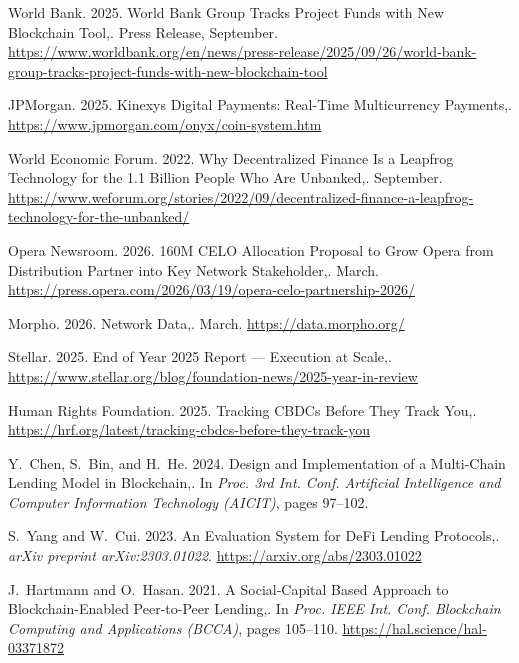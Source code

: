 {\begin{enumerate}[label={[\arabic*]}]
\item World Bank. 2025. World Bank Group Tracks Project Funds with New Blockchain Tool,. Press Release, September. \url{https://www.worldbank.org/en/news/press-release/2025/09/26/world-bank-group-tracks-project-funds-with-new-blockchain-tool}

\item JPMorgan. 2025. Kinexys Digital Payments: Real-Time Multicurrency Payments,. \url{https://www.jpmorgan.com/onyx/coin-system.htm}

\item World Economic Forum. 2022. Why Decentralized Finance Is a Leapfrog Technology for the 1.1 Billion People Who Are Unbanked,. September. \url{https://www.weforum.org/stories/2022/09/decentralized-finance-a-leapfrog-technology-for-the-unbanked/}

\item Opera Newsroom. 2026. 160M CELO Allocation Proposal to Grow Opera from Distribution Partner into Key Network Stakeholder,. March. \url{https://press.opera.com/2026/03/19/opera-celo-partnership-2026/}

\item Morpho. 2026. Network Data,. March. \url{https://data.morpho.org/}

\item Stellar. 2025. End of Year 2025 Report --- Execution at Scale,. \url{https://www.stellar.org/blog/foundation-news/2025-year-in-review}

\item Human Rights Foundation. 2025. Tracking CBDCs Before They Track You,. \url{https://hrf.org/latest/tracking-cbdcs-before-they-track-you}

\item Y.~Chen, S.~Bin, and H.~He. 2024. Design and Implementation of a Multi-Chain Lending Model in Blockchain,. In \emph{Proc. 3rd Int. Conf. Artificial Intelligence and Computer Information Technology (AICIT)}, pages 97--102.

\item S.~Yang and W.~Cui. 2023. An Evaluation System for DeFi Lending Protocols,. \emph{arXiv preprint arXiv:2303.01022}. \url{https://arxiv.org/abs/2303.01022}

\item J.~Hartmann and O.~Hasan. 2021. A Social-Capital Based Approach to Blockchain-Enabled Peer-to-Peer Lending,. In \emph{Proc. IEEE Int. Conf. Blockchain Computing and Applications (BCCA)}, pages 105--110. \url{https://hal.science/hal-03371872}


\end{enumerate}}
